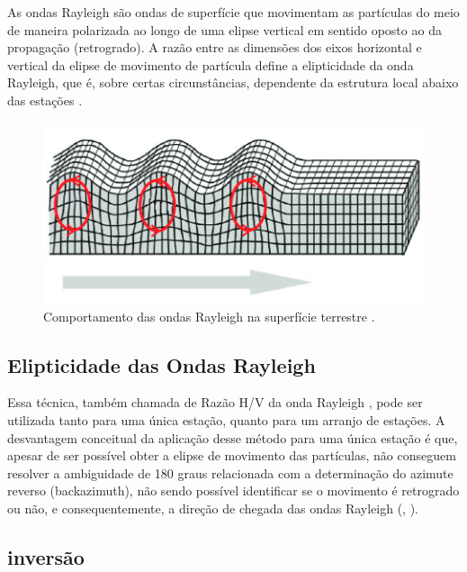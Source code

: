 \documentclass[smallextended]{svjour3}       %
\begin{document}
As ondas Rayleigh são ondas de superfície que movimentam as partículas do meio de maneira polarizada ao longo de uma elipse vertical em sentido oposto ao da propagação (retrogrado). A razão entre as dimensões dos eixos horizontal e vertical da elipse de movimento de partícula define a elipticidade da onda Rayleigh, que é, sobre certas circunstâncias, dependente da estrutura local abaixo das estações \citep{berbellini2019constraining}.

\begin{figure}[!hbtp]
\begin{center}

\includegraphics[scale=0.5]{Figures/ondas_rayleigh.png}
\end{center}
\caption{Comportamento das ondas Rayleigh na superfície terrestre \citep{de2009filtragem}.}
\label{ondas_rayleigh}
\end{figure}

\subsection{Elipticidade das Ondas Rayleigh}

Essa técnica, também chamada de Razão H/V da onda Rayleigh \citep{workman2017determination}, pode ser utilizada tanto para uma única estação, quanto para um arranjo de estações. A desvantagem conceitual da aplicação desse método para uma única estação é que, apesar de ser possível obter a elipse de movimento das partículas, não conseguem resolver a ambiguidade de 180 graus relacionada com a determinação do azimute reverso (backazimuth), não sendo possível identificar se o movimento é retrogrado ou não, e consequentemente, a direção de chegada das ondas Rayleigh (\citealp{workman2017determination}, \citealp{berbellini2019constraining}).

\subsection{inversão}
\end{document}
